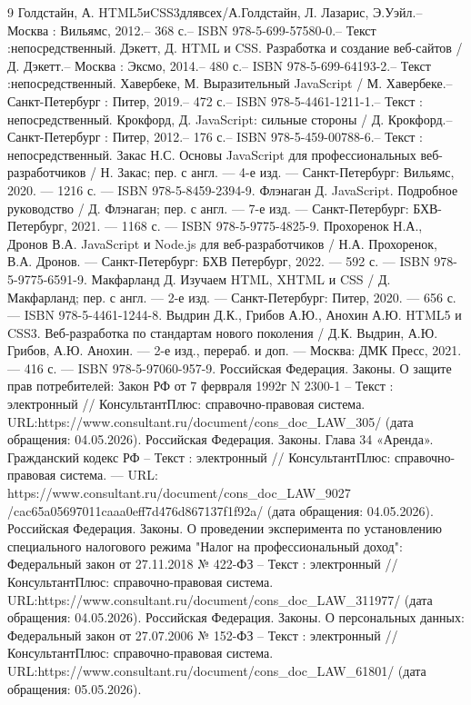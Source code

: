 \begin{thebibliography}{9}
     Голдстайн, А. HTML5иCSS3длявсех/А.Голдстайн, Л. Лазарис, Э.Уэйл.– Москва : Вильямс, 2012.– 368 с.– ISBN 978-5-699-57580-0.– Текст :непосредственный.
     Дэкетт, Д. HTML и CSS. Разработка и создание веб-сайтов / Д. Дэкетт.– Москва : Эксмо, 2014.– 480 с.– ISBN 978-5-699-64193-2.– Текст :непосредственный.
     Хавербеке, М. Выразительный JavaScript / М. Хавербеке.– Санкт-Петербург : Питер, 2019.– 472 с.– ISBN 978-5-4461-1211-1.– Текст : непосредственный.
     Крокфорд, Д. JavaScript: сильные стороны / Д. Крокфорд.– Санкт-Петербург : Питер, 2012.– 176 с.– ISBN 978-5-459-00788-6.– Текст : непосредственный.
     Закас Н.С. Основы JavaScript для профессиональных веб-разработчиков / Н. Закас; пер. с англ. — 4-е изд. — Санкт-Петербург: Вильямс, 2020. — 1216 с. — ISBN 978-5-8459-2394-9.
     Флэнаган Д. JavaScript. Подробное руководство / Д. Флэнаган; пер. с англ. — 7-е изд. — Санкт-Петербург: БХВ-Петербург, 2021. — 1168 с. — ISBN 978-5-9775-4825-9.
     Прохоренок Н.А., Дронов В.А. JavaScript и Node.js для веб-разработчиков / Н.А. Прохоренок, В.А. Дронов. — Санкт-Петербург: БХВ Петербург, 2022. — 592 с. — ISBN 978-5-9775-6591-9.
     Макфарланд Д. Изучаем HTML, XHTML и CSS / Д. Макфарланд; пер. с англ. — 2-е изд. — Санкт-Петербург: Питер, 2020. — 656 с. — ISBN 978-5-4461-1244-8.
     Выдрин Д.К., Грибов А.Ю., Анохин А.Ю. HTML5 и CSS3. Веб-разработка по стандартам нового поколения / Д.К. Выдрин, А.Ю. Грибов, А.Ю. Анохин. — 2-е изд., перераб. и доп. — Москва: ДМК Пресс, 2021. — 416 с. — ISBN 978-5-97060-957-9.
     Российская Федерация. Законы. О защите прав потребителей: Закон РФ от 7 фервраля 1992г N 2300-1 – Текст : электронный // КонсультантПлюс: справочно-правовая система. URL:https://www.consultant.ru/document/cons\_doc\_LAW\_305/ (дата обращения: 04.05.2026).
     Российская Федерация. Законы. Глава 34 «Аренда». Гражданский кодекс РФ – Текст : электронный // КонсультантПлюс: справочно-правовая система. — URL: https://www.consultant.ru/document/cons\_doc\_LAW\_9027
    /cac65a05697011caaa0eff7d476d867137f1f92a/ (дата обращения: 04.05.2026).
     Российская Федерация. Законы. О проведении эксперимента по установлению специального налогового режима "Налог на профессиональный доход": Федеральный закон от 27.11.2018 № 422-ФЗ – Текст : электронный // КонсультантПлюс: справочно-правовая система. URL:https://www.consultant.ru/document/cons\_doc\_LAW\_311977/ (дата обращения: 04.05.2026).
     Российская Федерация. Законы. О персональных данных: Федеральный закон от 27.07.2006 № 152-ФЗ – Текст : электронный // КонсультантПлюс: справочно-правовая система. URL:https://www.consultant.ru/document/cons\_doc\_LAW\_61801/ (дата обращения: 05.05.2026).

\end{thebibliography}
